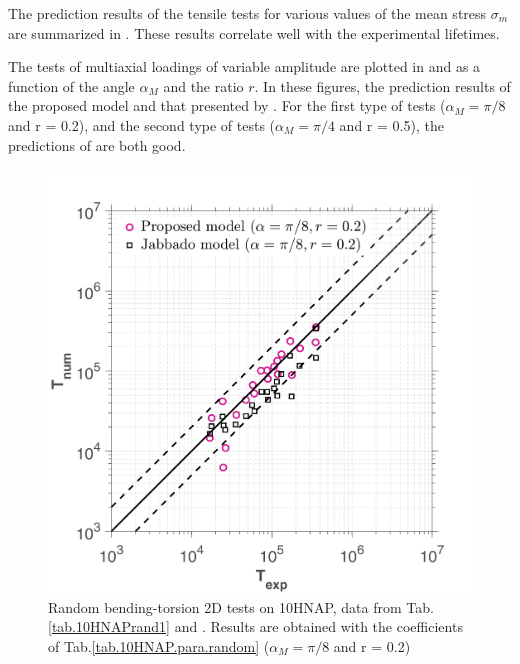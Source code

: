 The prediction results of the tensile tests for various values of the mean stress $\sigma_m$ are summarized in . These results correlate well with the experimental lifetimes. 


The tests of multiaxial loadings of variable amplitude are plotted in  and  as a function of the angle $\alpha_{M}$ and the ratio $r$. In these figures, the prediction results of the proposed model and that presented by \cite{carpinteri2003multiaxial}. For the first type of tests ($\alpha_{M} = \pi/8$ and r = 0.2), and the second type of tests ($\alpha_{M} = \pi/4$ and r = 0.5), the predictions of \cite{carpinteri2003multiaxial} are both good. 
\begin{figure}[!h]
	\centering
	\includegraphics[width=\textwidth]{figures//HNAP_random_r02_error.png} 
	\caption{Random bending-torsion 2D tests on 10HNAP, data from Tab.\ref{tab.10HNAPrand1} and \cite{jabbado:pastel-00002116}. Results are obtained with the coefficients of Tab.\ref{tab.10HNAP.para.random} ($\alpha_{M} = \pi/8$ and r = 0.2)}
	\label{fig.10HNAP_random02}
\end{figure}

